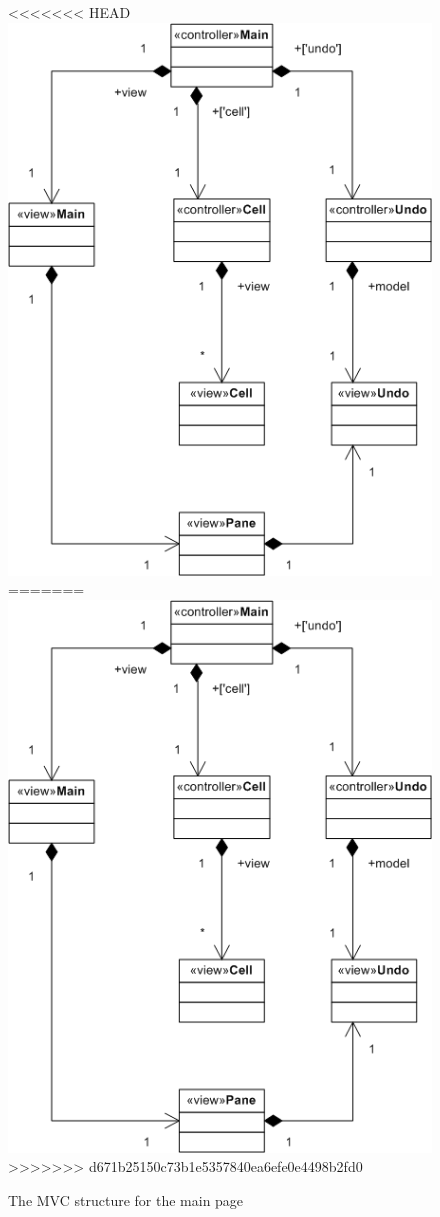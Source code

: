 \documentclass{report}
\begin{document}
					\begin{figure}[h!]
						\begin{center}
<<<<<<< HEAD
							\includegraphics{main_struct.png}
=======
							\includegraphics[scale=0.55]{main_struct.png}
>>>>>>> d671b25150c73b1e5357840ea6efe0e4498b2fd0
							\caption{The MVC structure for the main page}
							\label{fig: main struct}
						\end{center}
					\end{figure}	
\end{document}
